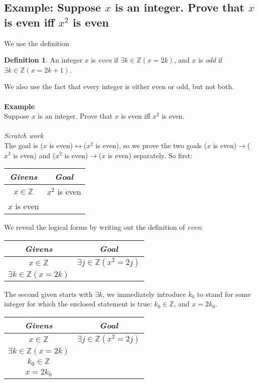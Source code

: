 \documentclass{report}
\theoremstyle{definition}
\newtheorem*{definition}{Definition}
\begin{document}
\subsection{Example: Suppose $x$ is an integer. Prove that $x$ is even iff $x^2$ is even}
We use the definition
\begin{definition}
An integer $x$ is \textit{even} if $\exists k\in\mathbb Z(x=2k)$, and $x$ is \textit{odd} if 
$\exists k\in\mathbb Z(x=2k+1)$.
\end{definition}
\noindent We also use the fact that every integer is either even or odd, but not both.\\
\vspace{1mm}\\
\textbf{Example}\\
Suppose $x$ is an integer. Prove that $x$ is even iff $x^2$ is even.\\
\vspace{1mm}\\
\textit{Scratch work}\\
The goal is ($x$ is even)$\leftrightarrow$($x^2$ is even), so we prove the two goals
($x$ is even)$\to$($x^2$ is even) and ($x^2$ is even)$\to$($x$ is even) separately. So first:
\begin{center}
\begin{tabular}{c|c}
\textit{Givens}&\textit{Goal}\\
\hline
$x\in\mathbb Z$&$x^2$ is even\\
$x$ is even&\\
\end{tabular}
\end{center}
We reveal the logical forms by writing out the definition of \textit{even}:
\begin{center}
\begin{tabular}{c|c}
\textit{Givens}&\textit{Goal}\\
\hline
$x\in\mathbb Z$&$\exists j\in\mathbb Z(x^2=2j)$\\
$\exists k\in\mathbb Z(x=2k)$\\
\end{tabular}
\end{center}
The second given starts with $\exists k$, we immediately introduce $k_0$ to stand for some integer for which the enclosed statement is true: $k_0\in\mathbb Z$, and $x=2k_0$.
\begin{center}
\begin{tabular}{c|c}
\textit{Givens}&\textit{Goal}\\
\hline
$x\in\mathbb Z$&$\exists j\in\mathbb Z(x^2=2j)$\\
$\exists k\in\mathbb Z(x=2k)$&\\
$k_0\in\mathbb Z$&\\
$x=2k_0$&
\end{tabular}
\end{center}
\end{document}
